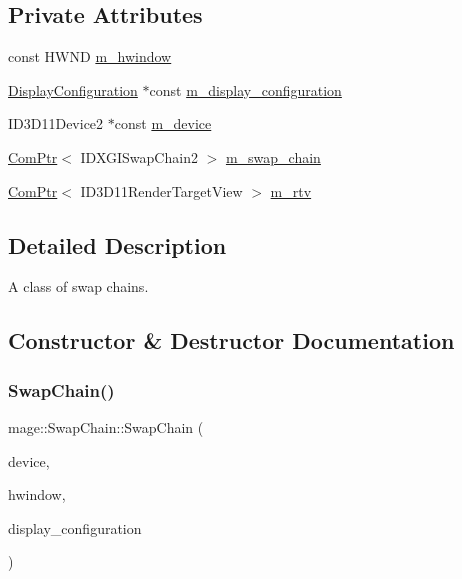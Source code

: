 \subsection*{Private Attributes}
\begin{DoxyCompactItemize}
\item 
const H\+W\+ND \hyperlink{classmage_1_1_swap_chain_aea5964cd3bd2bfef89ae428cceef82fd}{m\+\_\+hwindow}
\item 
\hyperlink{structmage_1_1_display_configuration}{Display\+Configuration} $\ast$const \hyperlink{classmage_1_1_swap_chain_ac1aa833943aa6bfe464da32316f7096f}{m\+\_\+display\+\_\+configuration}
\item 
I\+D3\+D11\+Device2 $\ast$const \hyperlink{classmage_1_1_swap_chain_aa9b2db7026b84c37e94dad44566a0208}{m\+\_\+device}
\item 
\hyperlink{namespacemage_ae74f374780900893caa5555d1031fd79}{Com\+Ptr}$<$ I\+D\+X\+G\+I\+Swap\+Chain2 $>$ \hyperlink{classmage_1_1_swap_chain_ac7ac016259f4496b56c20f7a0499968b}{m\+\_\+swap\+\_\+chain}
\item 
\hyperlink{namespacemage_ae74f374780900893caa5555d1031fd79}{Com\+Ptr}$<$ I\+D3\+D11\+Render\+Target\+View $>$ \hyperlink{classmage_1_1_swap_chain_a87610dab11ac73b2e5c2510e013640ac}{m\+\_\+rtv}
\end{DoxyCompactItemize}


\subsection{Detailed Description}
A class of swap chains. 

\subsection{Constructor \& Destructor Documentation}
\hypertarget{classmage_1_1_swap_chain_a039bcb99605d47802d0efc24292f2cfa}{}\label{classmage_1_1_swap_chain_a039bcb99605d47802d0efc24292f2cfa} 
\subsubsection{\texorpdfstring{Swap\+Chain()}{SwapChain()}\hspace{0.1cm}{\footnotesize\ttfamily [1/3]}}
{\footnotesize\ttfamily mage\+::\+Swap\+Chain\+::\+Swap\+Chain (\begin{DoxyParamCaption}\item[{I\+D3\+D11\+Device2 $\ast$}]{device,  }\item[{H\+W\+ND}]{hwindow,  }\item[{\hyperlink{structmage_1_1_display_configuration}{Display\+Configuration} $\ast$}]{display\+\_\+configuration }\end{DoxyParamCaption})\hspace{0.3cm}{\ttfamily [explicit]}}

